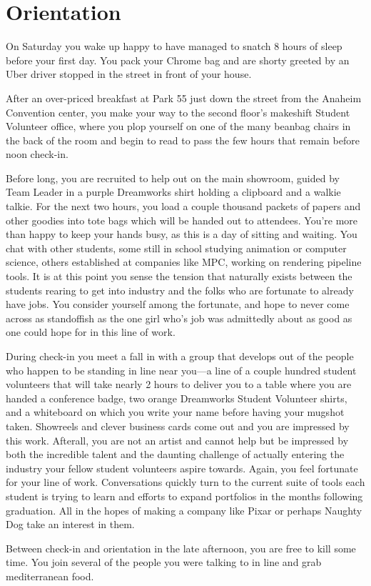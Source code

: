 \documentclass[../main.tex]{subfiles}
\begin{document}
\section{Orientation}

On Saturday you wake up happy to have managed to snatch 8 hours of sleep before your first day. You pack your Chrome bag and are shorty greeted by an Uber driver stopped in the street in front of your house.

After an over-priced breakfast at Park 55 just down the street from the Anaheim Convention center, you make your way to the second floor's makeshift Student Volunteer office, where you plop yourself on one of the many beanbag chairs in the back of the room and begin to read to pass the few hours that remain before noon check-in.

Before long, you are recruited to help out on the main showroom, guided by Team Leader in a purple Dreamworks shirt holding a clipboard and a walkie talkie. For the next two hours, you load a couple thousand packets of papers and other goodies into tote bags which will be handed out to attendees. You're more than happy to keep your hands busy, as this is a day of sitting and waiting. You chat with other students, some still in school studying animation or computer science, others established at companies like MPC, working on rendering pipeline tools. It is at this point you sense the tension that naturally exists between the students rearing to get into industry and the folks who are fortunate to already have jobs. You consider yourself among the fortunate, and hope to never come across as standoffish as the one girl who's job was admittedly about as good as one could hope for in this line of work.

During check-in you meet a fall in with a group that develops out of the people who happen to be standing in line near you---a line of a couple hundred student volunteers that will take nearly 2 hours to deliver you to a table where you are handed a conference badge, two orange Dreamworks Student Volunteer shirts, and a whiteboard on which you write your name before having your mugshot taken. Showreels and clever business cards come out and you are impressed by this work. Afterall, you are not an artist and cannot help but be impressed by both the incredible talent and the daunting challenge of actually entering the industry your fellow student volunteers aspire towards. Again, you feel fortunate for your line of work. Conversations quickly turn to the current suite of tools each student is trying to learn and efforts to expand portfolios in the months following graduation. All in the hopes of making a company like Pixar or perhaps Naughty Dog take an interest in them.

Between check-in and orientation in the late afternoon, you are free to kill some time. You join several of the people you were talking to in line and grab mediterranean food.
\end{document}
